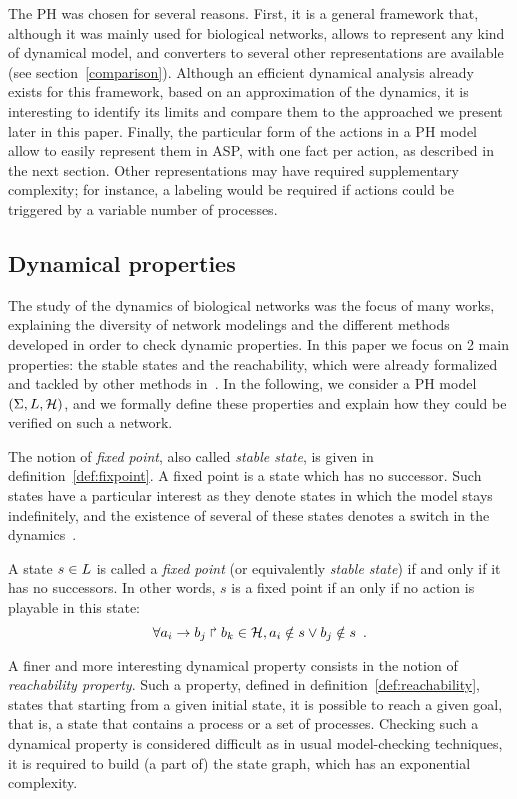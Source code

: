 The PH was chosen for several reasons.
First, it is a general framework that,
although it was mainly used for biological networks,
allows to represent any kind of dynamical model,
and converters to several other representations are available (see section~\ref{comparison}).
Although an efficient dynamical analysis already exists for this framework,
based on an approximation of the dynamics,
it is interesting to identify its limits
and compare them to the approached we present later in this paper.
Finally, the particular form of the actions in a PH model allow
to easily represent them in ASP,
with one fact per action, as described in the next section.
Other representations may have required supplementary complexity;
for instance, a labeling would be required
if actions could be triggered by a variable number of processes.

\subsection*{Dynamical properties}

The study of the dynamics of biological networks was the focus of many works, explaining the diversity of network modelings and the different methods developed in order to check dynamic properties.
In this paper we focus on 2 main properties: the stable states and the reachability,
which were already formalized and tackled by other methods in~\cite{PMR10-TCSB,PMR12-MSCS}.
In the following, we consider a PH model $(\Sigma,L,\mathcal{H})$,
and we formally define these properties
and explain how they could be verified on such a network.

The notion of \emph{fixed point}, also called \emph{stable state},
is given in definition~\ref{def:fixpoint}.
A fixed point is a state which has no successor.
Such states have a particular interest as they denote states in which the model
stays indefinitely,
and the existence of several of these states denotes a switch in the dynamics~\cite{wuensche1998genomic}.

\begin{definition}
\label{def:fixpoint}
  A state $s \in L$ is called a \emph{fixed point}
  (or equivalently \emph{stable state})
  if and only if it has no successors.
  In other words, $s$ is a fixed point if an only if no action is playable in this state:
  \[\forall a_i\rightarrow b_j\Rsh b_k \in \mathcal{H}, a_i \notin s \vee b_j \notin s \enspace.\]
\end{definition}

A finer and more interesting dynamical property consists in
the notion of \emph{reachability property}.
Such a property, defined in definition~\ref{def:reachability},
states that starting from a given initial state, it is possible
to reach a given goal, that is, a state that contains a process
or a set of processes.
Checking such a dynamical property is considered difficult
as in usual model-checking techniques,
it is required to build (a part of) the state graph,
which has an exponential complexity.

